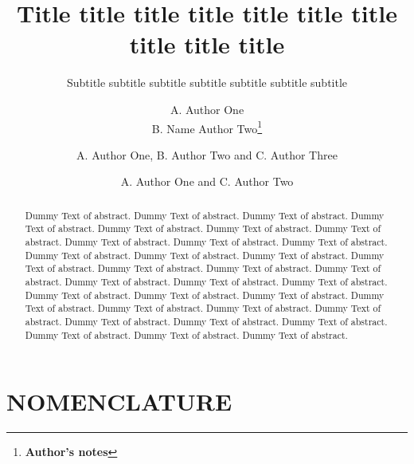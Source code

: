 \documentclass{isabec} %
\begin{document}

\title{Title title title title title title title title title title}
\subtitle{Subtitle subtitle subtitle subtitle subtitle subtitle subtitle}

\author{A. Author One\\ B. Name Author Two\thanks{{\bf Author's notes}}}

\author{A. Author One, B. Author Two and C. Author Three}
\author{A. Author One and C. Author Two}

\maketitle                   

\begin{abstract}
Dummy Text of abstract. Dummy Text of abstract. Dummy Text of abstract. Dummy Text of abstract. Dummy Text of abstract. Dummy Text of abstract. Dummy Text of abstract. Dummy Text of abstract. Dummy Text of abstract. Dummy Text of abstract. Dummy Text of abstract. Dummy Text of abstract. Dummy Text of abstract. Dummy Text of abstract. Dummy Text of abstract. Dummy Text of abstract. Dummy Text of abstract. Dummy Text of abstract. Dummy Text of abstract. Dummy Text of abstract. Dummy Text of abstract. Dummy Text of abstract. Dummy Text of abstract. Dummy Text of abstract. Dummy Text of abstract. Dummy Text of abstract. Dummy Text of abstract. Dummy Text of abstract. Dummy Text of abstract. Dummy Text of abstract. Dummy Text of abstract. Dummy Text of abstract. Dummy Text of abstract.
\end{abstract}

\section*{NOMENCLATURE} %
\begin{deflist}%
\end{deflist}
\end{document}
